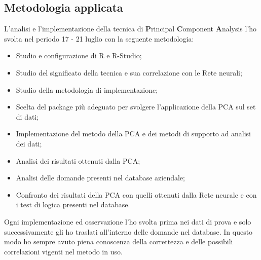 \subsection{Metodologia applicata}
\label{Metodologia applicata}
L'analisi e l'implementazione della tecnica di \textbf{P}rincipal \textbf{C}omponent \textbf{A}nalysis l'ho svolta nel periodo 17 - 21 luglio con la seguente metodologia:
\begin{itemize}
\item Studio e configurazione di R e R-Studio;
\item Studio del significato della tecnica e sua correlazione con le Rete neurali;
\item Studio della metodologia di implementazione;
\item Scelta del package pi\`u adeguato per svolgere l'applicazione della PCA sul set di dati;
\item Implementazione del metodo della PCA  e dei metodi di supporto ad analisi dei dati;
\item Analisi dei risultati ottenuti dalla PCA;
\item Analisi delle domande presenti nel database aziendale;
\item Confronto dei risultati della PCA con quelli ottenuti dalla Rete neurale e con i test di logica presenti nel database.
\end{itemize}
\noindent
Ogni implementazione ed osservazione l'ho svolta prima nei dati di prova e solo successivamente gli ho traslati all'interno delle domande nel database. In questo modo ho sempre avuto piena conoscenza della correttezza e delle possibili correlazioni vigenti nel metodo in uso.

